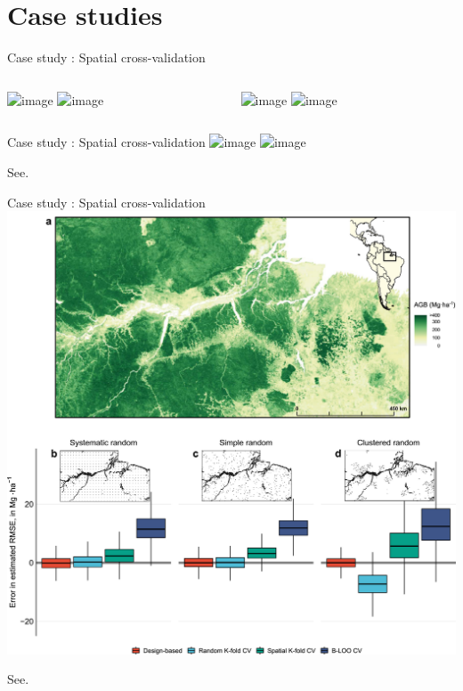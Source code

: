 \documentclass{irdbeamer}
\let\oldcite=\cite
\renewcommand{\cite}[1]{\textcolor[rgb]{.5,.5,.7}{\oldcite{#1}}}
\begin{document}
\section{Case studies}

\begin{frame}{Case study : Spatial cross-validation}
    \begin{columns}
        \begin{column}{.5\linewidth}
            \centering
    \includegraphics<1-3>[width=.5\textwidth]{./figs/spatial/2022.png}%
    \includegraphics<4>[width=.5\textwidth]{./figs/spatial/2022_pleiades.png}%
        \end{column}
        \begin{column}{.5\linewidth}
            \centering
    \includegraphics<2>[width=.5\textwidth]{./figs/spatial/vit_dino_4cl.png}%
    \includegraphics<3->[width=.5\textwidth]{./figs/spatial/resnet_dino.png}%
        \end{column}
    \end{columns}
\end{frame}

\begin{frame}{Case study : Spatial cross-validation}
    \centering
    \includegraphics<1>[width=.5\textwidth]{./figs/spatial/ploton2020.png}%
    \includegraphics<2>[width=.5\textwidth]{./figs/spatial/ploton2020-result.png}%
    
    \tiny See. \cite{ploton2020spatial}
\end{frame}

\begin{frame}{Case study : Spatial cross-validation}
    \centering
    \includegraphics[width=.4\textwidth]{./figs/spatial/wadoux2021.jpg}%
    
    \tiny See. \cite{wadoux2021spatial}
\end{frame}
\end{document}
